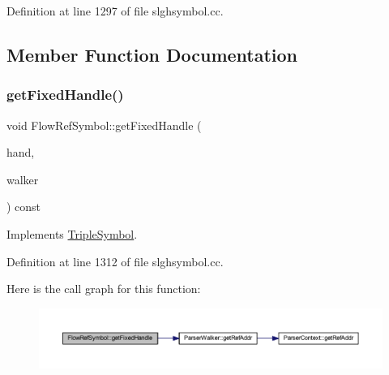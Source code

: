 Definition at line 1297 of file slghsymbol.\+cc.



\subsection{Member Function Documentation}
\mbox{\label{class_flow_ref_symbol_af26eaa696c4a83005f982aa4bfa5a740}} 
\subsubsection{\texorpdfstring{getFixedHandle()}{getFixedHandle()}}
{\footnotesize\ttfamily void Flow\+Ref\+Symbol\+::get\+Fixed\+Handle (\begin{DoxyParamCaption}\item[{\mbox{\hyperlink{struct_fixed_handle}{Fixed\+Handle}} \&}]{hand,  }\item[{\mbox{\hyperlink{class_parser_walker}{Parser\+Walker}} \&}]{walker }\end{DoxyParamCaption}) const\hspace{0.3cm}{\ttfamily [virtual]}}



Implements \mbox{\hyperlink{class_triple_symbol_aa71f48c79a2bee73e97fdfb8163b4e46}{Triple\+Symbol}}.



Definition at line 1312 of file slghsymbol.\+cc.

Here is the call graph for this function\+:
\nopagebreak
\begin{figure}[H]
\begin{center}
\leavevmode
\includegraphics[width=350pt]{class_flow_ref_symbol_af26eaa696c4a83005f982aa4bfa5a740_cgraph}
\end{center}
\end{figure}
\mbox{\label{class_flow_ref_symbol_a273808a2774690c6c194961c956e3330}} 
